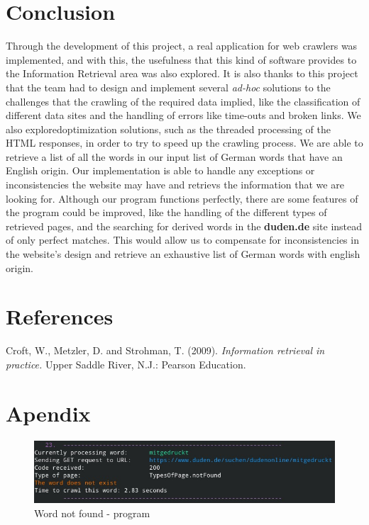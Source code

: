 \documentclass{article}
\begin{document}
\section{Conclusion}Through the development of this project, a real application for web crawlers was implemented, and with this, the usefulness that this kind of software provides to the Information Retrieval area was also explored. It is also thanks to this project that the team had to design and implement several \textit{ad-hoc} solutions to the challenges that the crawling of the required data implied, like the classification of different data sites and the handling of errors like time-outs and broken links. We also exploredoptimization solutions, such as the threaded processing of the HTML responses, in order to try to speed up the crawling process. We are able to retrieve a list of all the words in our input list of German words that have an English origin. Our implementation is able to handle any exceptions or inconsistencies the website may have and retrievs the information that we are looking for. Although our program functions perfectly, there are some features of the program could be improved, like the handling of the different types of retrieved pages, and the searching for derived words in the \textbf{duden.de} site instead of only perfect matches. This would allow us to compensate for inconsistencies in the website's design and retrieve an exhaustive list of German words with english origin.

\section{References}
Croft, W., Metzler, D. and Strohman, T. (2009). \textit{Information retrieval in practice.} Upper Saddle River, N.J.: Pearson Education.

\section{Apendix}

\begin{figure}[h]
	\caption{Word not found - program}
	\centering
	\includegraphics[scale=0.5]{1}
\end{figure}
\end{document}
